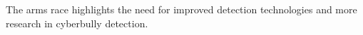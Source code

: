The arms race highlights the need for improved detection technologies and more research in cyberbully detection.